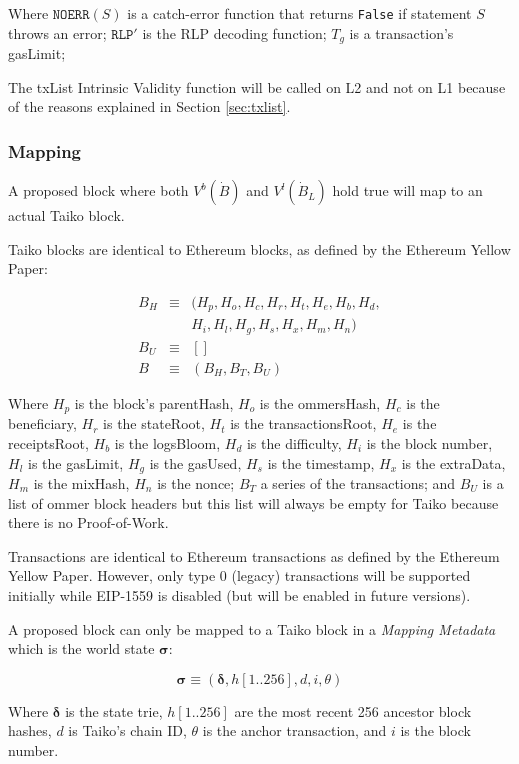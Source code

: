 \documentclass[9pt,oneside]{amsart}
\begin{document}
\begin{multicols}{2}
Where $\texttt{NOERR}(S)$ is a catch-error function that returns \texttt{False} if statement $S$ throws an error; $\texttt{RLP}'$ is the RLP decoding function;  $T_g$ is a transaction's gasLimit; 

The txList Intrinsic Validity function will be called on L2 and not on L1 because of the reasons explained in Section \ref{sec:txlist}.

\subsubsection{Mapping}

A proposed block where both $V^b(\dot{B})$ and $V^l(\dot{B}_L)$ hold true will map to an actual Taiko block.

Taiko blocks are identical to Ethereum blocks, as defined by the Ethereum Yellow Paper\cite{yellow-paper}:

\begin{eqnarray}
B_H & \equiv & (H_p, H_o, H_c, H_r, H_t, H_e, H_b, H_d, \\
\nonumber & & H_i, H_l,H_g, H_s, H_x, H_m, H_n) \\
B_U  & \equiv & [] \\
B & \equiv & (B_H, B_T, B_U)
\end{eqnarray}

Where $H_p$ is the block's parentHash, $H_o$ is the ommersHash, $H_c$ is the beneficiary, $H_r$ is the stateRoot, $H_t$ is the transactionsRoot, $H_e$ is the receiptsRoot, $H_b$ is the logsBloom, $H_d$ is the difficulty, $H_i$ is the block number, $H_l$ is the gasLimit, $H_g$ is the gasUsed, $H_s$ is the timestamp, $H_x$ is the extraData, $H_m$ is the mixHash, $H_n$ is the nonce; $B_T$ a series of the transactions; and $B_U$ is a list of ommer block headers but this list will always be empty for Taiko because there is no Proof-of-Work.

Transactions are identical to Ethereum transactions as defined by the Ethereum Yellow Paper\cite{yellow-paper}. However, only type 0 (legacy) transactions will be supported initially while EIP-1559 is disabled (but will be enabled in future versions).

A proposed block can only be mapped to a Taiko block in a \emph{Mapping Metadata} which is the world state $\boldsymbol{\sigma}$:

$$\boldsymbol{\sigma} \equiv (\boldsymbol{\delta}, h[1..256], d, i, \theta)$$

Where $\boldsymbol{\delta}$ is the state trie, $h[1..256]$ are the most recent 256 ancestor block hashes, $d$ is Taiko's chain ID, $\theta$ is the anchor transaction, and $i$ is the block number.


\end{multicols}
\end{document}

